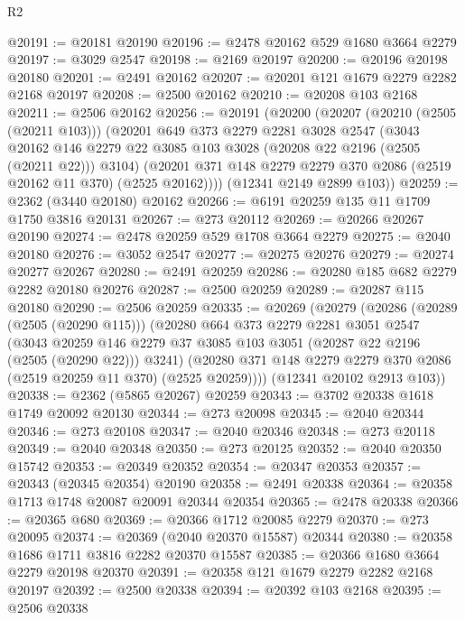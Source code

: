 \begin{lexlean}{R2}
\begin{coremodule}
@20191 := @20181 @20190
@20196 := @2478 @20162 @529 @1680 @3664 @2279
@20197 := @3029 @2547
@20198 := @2169 @20197
@20200 := @20196 @20198 @20180
@20201 := @2491 @20162
@20207 := @20201 @121 @1679 @2279 @2282 @2168 @20197
@20208 := @2500 @20162
@20210 := @20208 @103 @2168
@20211 := @2506 @20162
@20256 := @20191
    (@20200
      (@20207
        (@20210 (@2505 (@20211 @103)))
        (@20201
          @649
          @373
          @2279
          @2281
          @3028
          @2547
          (@3043
            @20162
            @146
            @2279
            @22
            @3085
            @103
            @3028
            (@20208 @22 @2196 (@2505 (@20211 @22)))
            @3104)
          (@20201 @371 @148 @2279 @2279 @370 @2086 (@2519 @20162 @11 @370) (@2525 @20162))))
      (@12341 @2149 @2899 @103))
@20259 := @2362 (@3440 @20180) @20162
@20266 := @6191 @20259 @135 @11 @1709 @1750 @3816 @20131
@20267 := @273 @20112
@20269 := @20266 @20267 @20190
@20274 := @2478 @20259 @529 @1708 @3664 @2279
@20275 := @2040 @20180
@20276 := @3052 @2547
@20277 := @20275 @20276
@20279 := @20274 @20277 @20267
@20280 := @2491 @20259
@20286 := @20280 @185 @682 @2279 @2282 @20180 @20276
@20287 := @2500 @20259
@20289 := @20287 @115 @20180
@20290 := @2506 @20259
@20335 := @20269
    (@20279
      (@20286
        (@20289 (@2505 (@20290 @115)))
        (@20280
          @664
          @373
          @2279
          @2281
          @3051
          @2547
          (@3043
            @20259
            @146
            @2279
            @37
            @3085
            @103
            @3051
            (@20287 @22 @2196 (@2505 (@20290 @22)))
            @3241)
          (@20280 @371 @148 @2279 @2279 @370 @2086 (@2519 @20259 @11 @370) (@2525 @20259))))
      (@12341 @20102 @2913 @103))
@20338 := @2362 (@5865 @20267) @20259
@20343 := @3702 @20338 @1618 @1749 @20092 @20130
@20344 := @273 @20098
@20345 := @2040 @20344
@20346 := @273 @20108
@20347 := @2040 @20346
@20348 := @273 @20118
@20349 := @2040 @20348
@20350 := @273 @20125
@20352 := @2040 @20350 @15742
@20353 := @20349 @20352
@20354 := @20347 @20353
@20357 := @20343 (@20345 @20354) @20190
@20358 := @2491 @20338
@20364 := @20358 @1713 @1748 @20087 @20091 @20344 @20354
@20365 := @2478 @20338
@20366 := @20365 @680
@20369 := @20366 @1712 @20085 @2279
@20370 := @273 @20095
@20374 := @20369 (@2040 @20370 @15587) @20344
@20380 := @20358 @1686 @1711 @3816 @2282 @20370 @15587
@20385 := @20366 @1680 @3664 @2279 @20198 @20370
@20391 := @20358 @121 @1679 @2279 @2282 @2168 @20197
@20392 := @2500 @20338
@20394 := @20392 @103 @2168
@20395 := @2506 @20338

\end{coremodule}
\end{lexlean}

